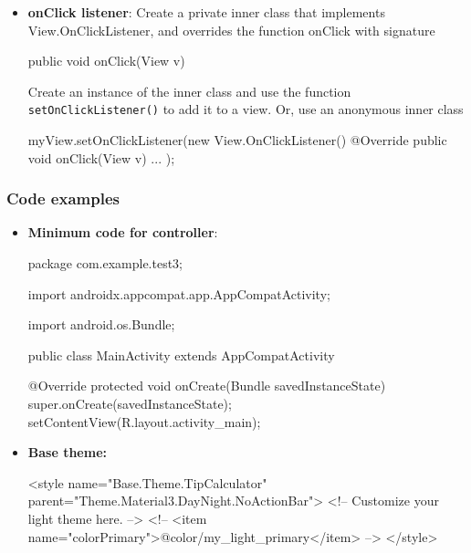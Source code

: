 \documentclass{report}
\begin{document}
\begin{itemize}
        \item \textbf{onClick listener}: Create a private inner class that implements View.OnClickListener, and overrides the function onClick with signature
            \bigbreak \noindent 
            \begin{javacode}
            public void onClick(View v)
            \end{javacode}
            \bigbreak \noindent 
            Create an instance of the inner class and use the function \texttt{setOnClickListener()} to add it to a view.
            \bigbreak \noindent 
            Or, use an anonymous inner class
            \bigbreak \noindent 
            \begin{javacode}
                myView.setOnClickListener(new View.OnClickListener() {
                    @Override
                    public void onClick(View v) {
                        ...
                    }
                });
            \end{javacode}

    \end{itemize}


\pagebreak 
    \subsubsection{Code examples}
    \begin{itemize}
        \item \textbf{Minimum code for controller}:
            \bigbreak \noindent 
            \begin{javacode}
                package com.example.test3;

                import androidx.appcompat.app.AppCompatActivity;

                import android.os.Bundle;

                public class MainActivity extends AppCompatActivity {

                    @Override
                    protected void onCreate(Bundle savedInstanceState) {
                        super.onCreate(savedInstanceState);
                        setContentView(R.layout.activity_main);
                    }
                }
            \end{javacode}
        \item \textbf{Base theme:} 
            \bigbreak \noindent 
            \begin{xmlcode}
                <style name="Base.Theme.TipCalculator" parent="Theme.Material3.DayNight.NoActionBar">
                    <!-- Customize your light theme here. -->
                    <!-- <item name="colorPrimary">@color/my_light_primary</item> -->
                </style>
            \end{xmlcode}
    \end{itemize}
\end{document}
